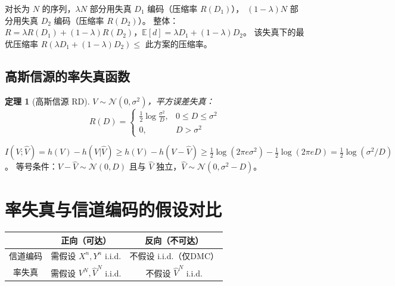 \documentclass[12pt,a4paper]{ctexart}
\newtheorem{theorem}{定理}[section]
\theoremstyle{definition}
\newcommand{\EE}{\mathbb{E}}
\begin{document}
\begin{proofbox}
对长为 $N$ 的序列，$\lambda N$ 部分用失真 $D_1$ 编码（压缩率 $R(D_1)$），
$(1-\lambda)N$ 部分用失真 $D_2$ 编码（压缩率 $R(D_2)$）。
整体：$R = \lambda R(D_1)+(1-\lambda)R(D_2)$，$\EE[d] = \lambda D_1+(1-\lambda)D_2$。
该失真下的最优压缩率 $R(\lambda D_1+(1-\lambda)D_2) \leq$ 此方案的压缩率。
\end{proofbox}

\subsection{高斯信源的率失真函数}

\begin{theorem}[高斯信源 RD]
$V \sim \mathcal{N}(0,\sigma^2)$，平方误差失真：
\[
R(D) = \begin{cases}
\displaystyle\frac{1}{2}\log\frac{\sigma^2}{D}, & 0 \leq D \leq \sigma^2 \\[8pt]
0, & D > \sigma^2
\end{cases}
\]
\end{theorem}

\begin{proofbox}
$I(V;\hat{V}) = h(V) - h(V|\hat{V}) \geq h(V) - h(V-\hat{V}) \geq
\frac{1}{2}\log(2\pi e \sigma^2) - \frac{1}{2}\log(2\pi e D) = \frac{1}{2}\log(\sigma^2/D)$。
等号条件：$V-\hat{V} \sim \mathcal{N}(0,D)$ 且与 $\hat{V}$ 独立，$\hat{V} \sim \mathcal{N}(0,\sigma^2-D)$。
\end{proofbox}

\section{率失真与信道编码的假设对比}

\begin{keybox}[可达性证明中的独立同假设]
\begin{center}
\begin{tabular}{c|c|c}
\toprule
& 正向（可达） & 反向（不可达） \\
\midrule
信道编码 & 需假设 $X^n,Y^n$ i.i.d. & 不假设 i.i.d.（仅DMC） \\
率失真 & 需假设 $V^N,\hat{V}^N$ i.i.d. & 不假设 $\hat{V}^N$ i.i.d. \\
\bottomrule
\end{tabular}
\end{center}
\end{keybox}
\end{document}
